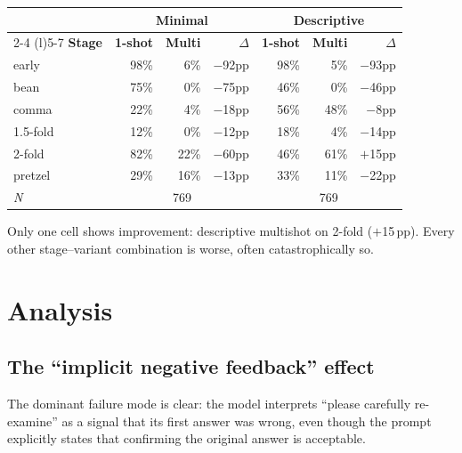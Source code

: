 \documentclass[11pt, a4paper]{article}
\begin{document}
\begin{center}
\begin{tabular}{@{}lrrrrrr@{}}
\toprule
& \multicolumn{3}{c}{\textbf{Minimal}} & \multicolumn{3}{c}{\textbf{Descriptive}} \\
\cmidrule(lr){2-4} \cmidrule(l){5-7}
\textbf{Stage} & \textbf{1-shot} & \textbf{Multi} & \textbf{$\Delta$} & \textbf{1-shot} & \textbf{Multi} & \textbf{$\Delta$} \\
\midrule
early    & 98\% &  6\% & \textcolor{neg}{$-$92pp} & 98\% &  5\% & \textcolor{neg}{$-$93pp} \\
bean     & 75\% &  0\% & \textcolor{neg}{$-$75pp} & 46\% &  0\% & \textcolor{neg}{$-$46pp} \\
comma    & 22\% &  4\% & \textcolor{neg}{$-$18pp} & 56\% & 48\% & \textcolor{neg}{$-$8pp}  \\
1.5-fold & 12\% &  0\% & \textcolor{neg}{$-$12pp} & 18\% &  4\% & \textcolor{neg}{$-$14pp} \\
2-fold   & 82\% & 22\% & \textcolor{neg}{$-$60pp} & 46\% & 61\% & \textcolor{pos}{$+$15pp} \\
pretzel  & 29\% & 16\% & \textcolor{neg}{$-$13pp} & 33\% & 11\% & \textcolor{neg}{$-$22pp} \\
\midrule
\textit{N} & \multicolumn{3}{c}{769} & \multicolumn{3}{c}{769} \\
\bottomrule
\end{tabular}
\end{center}

Only one cell shows improvement: descriptive multishot on 2-fold
($+$15\,pp).  Every other stage--variant combination is worse, often
catastrophically so.

\section{Analysis}

\subsection{The ``implicit negative feedback'' effect}

The dominant failure mode is clear: the model interprets ``please carefully
re-examine'' as a signal that its first answer was wrong, even though the prompt
explicitly states that confirming the original answer is acceptable.
\end{document}
